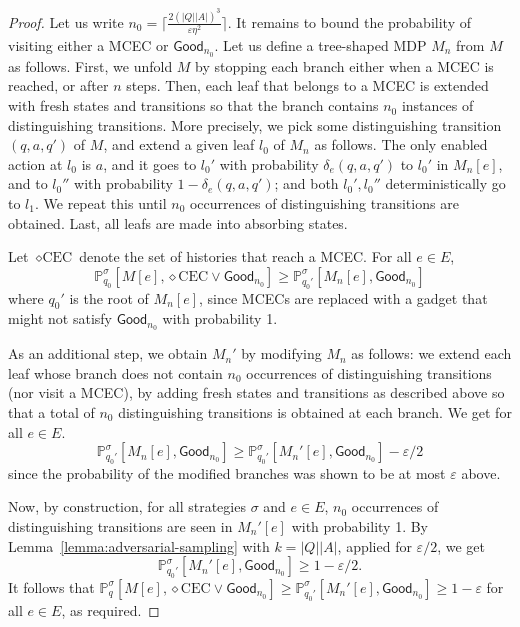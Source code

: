 \documentclass[a4paper,USenglish,cleveref, autoref, thm-restate]{lipics-v2021}
\let\epsilon\varepsilon
\def\abs#1{\ensuremath{\lvert #1 \rvert}}
\newcommand*{\pr}{\mathbb{P}}
\def\Good{\textsf{Good}}
\def\Act{A}
\begin{document}
\begin{proof}
  Let us write $n_0=\lceil \frac{2(\abs{Q}\abs{\Act})^3}{\epsilon\eta^2} \rceil$.
  It remains to bound the probability of visiting either a MCEC or $\Good_{n_0}$.
  Let us define a tree-shaped MDP $M_n$ from $M$ as follows. First, we unfold $M$ by stopping each branch either when a MCEC is reached, or after $n$ steps.
  Then, each leaf that belongs to a MCEC is extended with 
  fresh states and transitions so that the branch contains $n_0$ instances of distinguishing transitions.
  More precisely, we pick some distinguishing transition $(q,a,q')$ of $M$, and extend a given leaf $l_0$ of $M_n$ as follows.
  The only enabled action at $l_0$ is $a$, and it goes to $l_0'$ with probability $\delta_e(q,a,q')$ to $l_0'$ in $M_n[e]$,
  and to $l_0''$ with probability $1-\delta_e(q,a,q')$; and both $l_0',l_0''$ deterministically go to $l_1$. We repeat this until $n_0$ 
  occurrences of distinguishing transitions are obtained.
  Last, all leafs are made into absorbing states.
  
  Let $\diamond \textrm{CEC}$ denote the set of histories that reach a MCEC.
  For all $e\in E$,
  \[
    \pr_{q_0}^\sigma[M[e], \diamond \textrm{CEC} \lor \Good_{n_0}] \geq
    \pr_{q_0'}^\sigma[M_n[e], \Good_{n_0}]
  \]
  where $q_0'$ is the root of $M_n[e]$,
  since MCECs are replaced with a gadget that might not satisfy $\Good_{n_0}$ with probability 1.

  As an additional step, we obtain $M_n'$ by modifying $M_n$ as follows: we extend each leaf whose branch does not contain $n_0$ occurrences of distinguishing transitions (nor visit a MCEC),
  by adding fresh states and transitions as described above so that a total of $n_0$ distinguishing transitions is obtained at each branch.
  We get for all $ e\in E$.
  \[
    \pr_{q_0'}^\sigma[M_n[e], \Good_{n_0}] \geq \pr_{q_0'}^\sigma[M_n'[e], \Good_{n_0}] - \epsilon/2
  \]
  since the probability of the modified branches was shown to be at most $\epsilon$ above.
  
  Now, by construction, for all strategies $\sigma$ and $e\in E$,
  $n_0$ occurrences of distinguishing transitions are seen in $M_n'[e]$ with probability 1.
  By Lemma~\ref{lemma:adversarial-sampling} with $k=\abs{Q}\abs{\Act}$, applied for $\epsilon/2$, we get
  \[
    \pr_{q_0'}^\sigma[M_n'[e], \Good_{n_0}] \geq 1 - \epsilon/2.
  \]
  It follows that
  $\pr_q^\sigma[M[e], \diamond \textrm{CEC} \lor \Good_{n_0}] \geq
  \pr_{q_0'}^\sigma[M_n'[e], \Good_{n_0}] \geq 1 - \epsilon$ for all $e \in E$, as required.
\end{proof}
\end{document}
